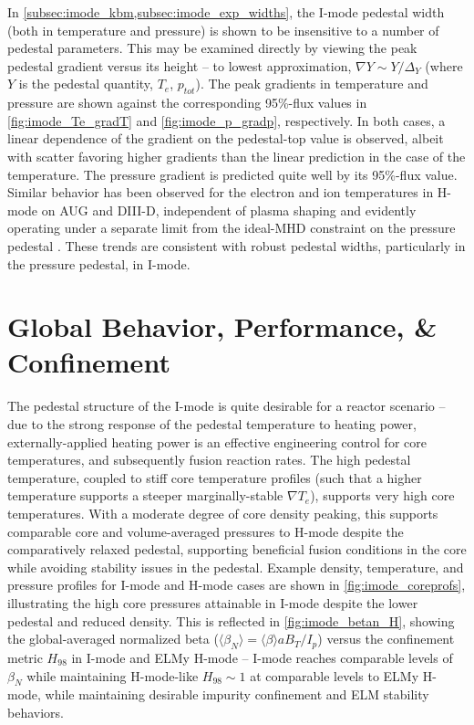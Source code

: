In \cref{subsec:imode_kbm,subsec:imode_exp_widths}, the I-mode pedestal width (both in temperature and pressure) is shown to be insensitive to a number of pedestal parameters.  This may be examined directly by viewing the peak pedestal gradient versus its height -- to lowest approximation, $\nabla Y \sim Y/\Delta_Y$ (where $Y$ is the pedestal quantity, \ie $T_e$, $p_{tot}$).  The peak gradients in temperature and pressure are shown against the corresponding 95\%-flux values in \cref{fig:imode_Te_gradT} and \cref{fig:imode_p_gradp}, respectively.  In both cases, a linear dependence of the gradient on the pedestal-top value is observed, albeit with scatter favoring higher gradients than the linear prediction in the case of the temperature.  The pressure gradient is predicted quite well by its 95\%-flux value.  Similar behavior has been observed for the electron and ion temperatures in H-mode on AUG and DIII-D, independent of plasma shaping and evidently operating under a separate limit from the ideal-MHD constraint on the pressure pedestal \cite{Schneider2013}.  These trends are consistent with robust pedestal widths, particularly in the pressure pedestal, in I-mode.\nicesectionending

\section{Global Behavior, Performance, \& Confinement}\label{sec:imode_confinement}

The pedestal structure of the I-mode is quite desirable for a reactor scenario -- due to the strong response of the pedestal temperature to heating power, externally-applied heating power is an effective engineering control for core temperatures, and subsequently fusion reaction rates.  The high pedestal temperature, coupled to stiff core temperature profiles (such that a higher temperature supports a steeper marginally-stable $\nabla T_e$), supports very high core temperatures.  With a moderate degree of core density peaking, this supports comparable core and volume-averaged pressures to H-mode despite the comparatively relaxed pedestal, supporting beneficial fusion conditions in the core while avoiding stability issues in the pedestal.  Example density, temperature, and pressure profiles for I-mode and H-mode cases are shown in \cref{fig:imode_coreprofs}, illustrating the high core pressures attainable in I-mode despite the lower pedestal and reduced density.  This is reflected in \cref{fig:imode_betan_H}, showing the global-averaged normalized beta ($\langle \beta_N \rangle = \langle \beta \rangle a B_T/I_p$) versus the confinement metric $H_{98}$ in I-mode and ELMy H-mode -- I-mode reaches comparable levels of $\beta_N$ while maintaining H-mode-like $H_{98} \sim 1$ at comparable levels to ELMy H-mode, while maintaining desirable impurity confinement and ELM stability behaviors.

